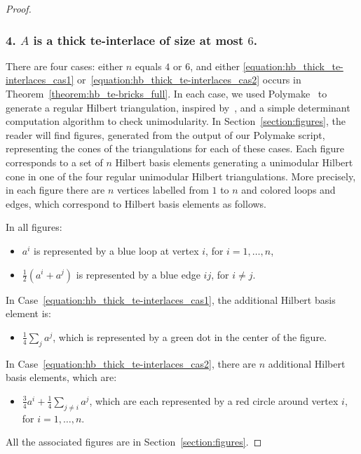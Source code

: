 \documentclass[11pt,a4paper]{amsart}
\theoremstyle{plain}
\theoremstyle{definition}
\begin{document}
\begin{proof}
\subsubsection*{4. $A$ is a thick te-interlace of size at most $6$.}
There are four cases: either $n$ equals $4$ or $6$, and either \ref{equation:hb_thick_te-interlaces_cas1} or~\ref{equation:hb_thick_te-interlaces_cas2} occurs in Theorem~\ref{theorem:hb_te-bricks_full}.
In each case, we used Polymake~\cite{Gawrilow_Joswig_2000} to generate a regular Hilbert triangulation, inspired by~\cite{DeLoera_Sturmfels_Thomas_1995}, and a simple determinant computation algorithm to check unimodularity.
In Section~\ref{section:figures}, the reader will find figures, generated from the output of our Polymake script, representing the cones of the triangulations for each of these cases.
Each figure corresponds to a set of $n$ Hilbert basis elements generating a unimodular Hilbert cone in one of the four regular unimodular Hilbert triangulations.	
More precisely, in each figure there are $n$ vertices labelled from $1$ to $n$ and colored loops and edges, which correspond to Hilbert basis elements as follows.

\medskip

In all figures:
\begin{itemize}
\item[\textbullet] $a^i$ is represented by a blue loop at vertex $i$, for $i=1,\ldots,n$,
\item[\textbullet] $\frac{1}{2} (a^i + a^j)$ is represented by a blue edge $ij$, for $i\neq j$.
\end{itemize}

In Case~\ref{equation:hb_thick_te-interlaces_cas1}, the additional Hilbert basis element is:
\begin{itemize}
\item[\textbullet] $\frac{1}{4}\sum_{j} a^j$, which is represented by a green dot in the center of the figure.
\end{itemize} 

In Case~\ref{equation:hb_thick_te-interlaces_cas2}, there are $n$ additional Hilbert basis elements, which are:
\begin{itemize}
\item[\textbullet] $\frac{3}{4}a^i+\frac{1}{4}\sum_{j\neq i} a^j$, which are each represented by a red circle around vertex $i$, for $i=1,\ldots,n$.
\end{itemize}
All the associated figures are in Section~\ref{section:figures}.
\end{proof}
\end{document}
